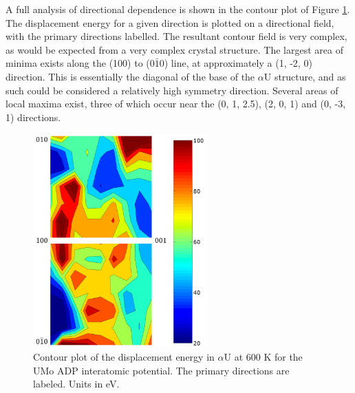 \documentclass[review]{elsarticle}
\begin{document}
\FloatBarrier

A full analysis of directional dependence is shown in the contour plot of Figure \ref{fig:600Kcontour}. The displacement energy for a given direction is plotted on a directional field, with the primary directions labelled. The resultant contour field is very complex, as would be expected from a very complex crystal structure. The largest area of minima exists along the (100) to (0$\bar{1}$0) line, at approximately a (1, -2, 0) direction. This is essentially the diagonal of the base of the $\alpha$U structure, and as such could be considered a relatively high symmetry direction. Several areas of local maxima exist, three of which occur near the (0, 1, 2.5), (2, 0, 1) and (0, -3, 1) directions. 

\begin{figure}[h]
 \centering
 \includegraphics[width=0.6\textwidth]{600K_contour.png} 
 \caption{Contour plot of the displacement energy in $\alpha$U at 600 K for the UMo ADP interatomic potential. The primary directions are labeled. Units in eV.}
 \label{fig:600Kcontour}
\end{figure}

\FloatBarrier
\end{document}
